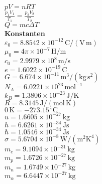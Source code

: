 \documentclass[a4paper,10pt,fleqn,twoside,twocolumn,dvipdfmx]{scrartcl}
\newcommand{\strong}[1]{\textsf{\textbf{#1}}}
\newcommand{\ds}{\displaystyle}
\begin{document}
$pV = nRT$\\
$\ds \frac{p_1 V_1}{T_1} = \frac{p_2 V_2}{T_2}$\\
$Q =mc\Delta T$\\[4pt]
\strong{Konstanten}\\
$\varepsilon_0 = 8.8542\times 10^{-12}\,\mathrm{C/(V\,m)}$\\
$\mu_0 = 4\pi\times 10^{-7}\,\mathrm{H/m}$\\
$c_0 = 2.9979\times 10^{8}\,\mathrm{m/s}$\\
$e = 1.6022\times 10^{-19}\,\mathrm{C}$\\
$G = 6.674\times 10^{-11}\,\mathrm{m^3/(kg\,s^2)}$\\[4pt]
%
$N_{\!A} = 6.0221\times 10^{23}\,\mathrm{mol}^{-1}$\\
$k_B = 1.3806\times 10^{-23}\,\mathrm{J/K}$\\
$R = 8.3145\,\mathrm{J/(mol\,K)}$\\[4pt]
%
$0\,\mathrm K = -273.15\,\mathrm{{}^\circ C}$\\
$u = 1.6605\times 10^{-27}\,\mathrm{kg}$\\
$h = 6.6261\times 10^{-34}\,\mathrm{Js}$\\
$\hbar = 1.0546\times 10^{-34}\,\mathrm{Js}$\\
$\sigma = 5.6704\times 10^{-8}\,\mathrm{W/(m^2 K^4)}$\\[4pt]
%
$m_e = 9.1094\times 10^{-31}\,\mathrm{kg}$\\
$m_p = 1.6726\times 10^{-27}\,\mathrm{kg}$\\
$m_n = 1.6749\times 10^{-27}\,\mathrm{kg}$\\
$m_\alpha = 6.6447\times 10^{-27}\,\mathrm{kg}$

\end{document}
